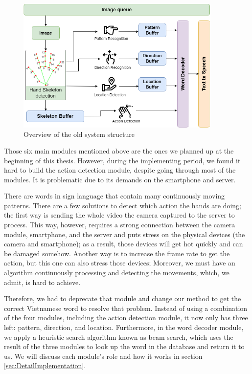 \begin{figure}[H]
	\centering
	\includegraphics[width=0.9\textwidth]{img/Chap4/OverviewOfTheSystemModules-Old.png}
	\caption{Overview of the old system structure}
	\label{fig:Chap4-OverviewOfTheSystemModules-Old}
\end{figure}

Those six main modules mentioned above are the ones we planned up at the beginning of this thesis. However, during the implementing period, we found it hard to build the action detection module, despite going through most of the modules. It is problematic due to its demands on the smartphone and server.

There are words in sign language that contain many continuously moving patterns. There are a few solutions to detect which action the hands are doing; the first way is sending the whole video the camera captured to the server to process. This way, however, requires a strong connection between the camera module, smartphone, and the server and puts stress on the physical devices (the camera and smartphone); as a result, those devices will get hot quickly and can be damaged somehow. Another way is to increase the frame rate to get the action, but this one can also stress those devices; Moreover, we must have an algorithm continuously processing and detecting the movements, which, we admit, is hard to achieve.

Therefore, we had to deprecate that module and change our method to get the correct Vietnamese word to resolve that problem. Instead of using a combination of the four modules, including the action detection module, it now only has three left: pattern, direction, and location. Furthermore, in the word decoder module, we apply a heuristic search algorithm known as beam search, which uses the result of the three modules to look up the word in the database and return it to us. We will discuss each module's role and how it works in section \ref{sec:DetailImplementation}.

